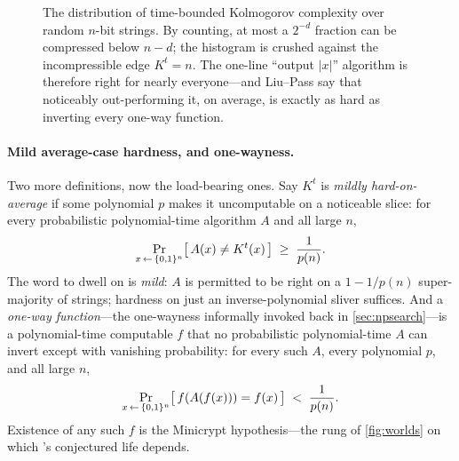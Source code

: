 \begin{figure}[ht]
  \centering
  \caption{The distribution of time-bounded Kolmogorov complexity over
  random $n$-bit strings. By counting, at most a $2^{-d}$ fraction can
  be compressed below $n-d$; the histogram is crushed against the
  incompressible edge $K^{t}\!=\!n$. The one-line ``output $|x|$''
  algorithm is therefore right for nearly everyone---and Liu--Pass say
  that noticeably out-performing it, on average, is exactly as hard as
  inverting every one-way function.}
  \label{fig:kolmogorov}
\end{figure}

\paragraph{Mild average-case hardness, and one-wayness.} Two more
definitions, now the load-bearing ones. Say $K^{t}$ is
\emph{mildly hard-on-average} if some polynomial $p$ makes it
uncomputable on a noticeable slice: for every probabilistic
polynomial-time algorithm $A$ and all large $n$,
\[
  \Pr_{x \,\gets\, \{0,1\}^{n}}
     \bigl[\, A(x) \ne K^{t}(x) \,\bigr] \;\ge\; \frac{1}{p(n)} .
\]
The word to dwell on is \emph{mild}: $A$ is permitted to be right on a
$1 - 1/p(n)$ super-majority of strings; hardness on just an
inverse-polynomial sliver suffices. And a \emph{one-way function}---the
one-wayness informally invoked back in \cref{sec:npsearch}---is a
polynomial-time computable $f$ that no probabilistic polynomial-time $A$
can invert except with vanishing probability: for every such $A$, every
polynomial $p$, and all large $n$,
\[
  \Pr_{x \,\gets\, \{0,1\}^{n}}
     \bigl[\, f(A(f(x))) = f(x) \,\bigr] \;<\; \frac{1}{p(n)} .
\]
Existence of any such $f$ is the Minicrypt hypothesis---the rung of
\cref{fig:worlds} on which \SHA{}'s conjectured life depends.

